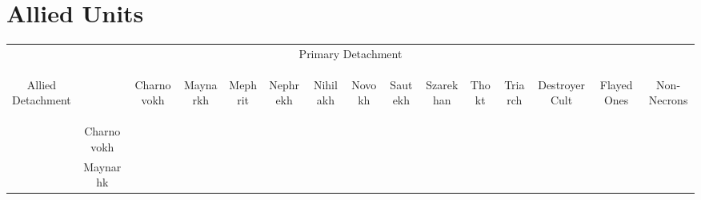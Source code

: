 \section{Allied Units}


\begin{tabular}{||c c c c c c c c c c c c c c c||}
	\hline
	\multicolumn{15}{||c||}{Primary Detachment} \\
	\multirow{14}{*}{\begin{sideways}Allied Detachment\end{sideways}} & & \begin{sideways}Charnovokh \end{sideways} & \begin{sideways}Maynarkh \end{sideways} & \begin{sideways}Mephrit \end{sideways} & \begin{sideways}Nephrekh \end{sideways} & \begin{sideways}Nihilakh \end{sideways} & \begin{sideways}Novokh \end{sideways} & \begin{sideways}Sautekh \end{sideways} & \begin{sideways}Szarekhan \end{sideways} & \begin{sideways}Thokt \end{sideways} & \begin{sideways}Triarch \end{sideways} & \begin{sideways}Destroyer Cult \end{sideways} & \begin{sideways}Flayed Ones \end{sideways} & \begin{sideways}Non-Necrons \end{sideways}\\
	& Charnovokh & & \greyskull & \blackskull & \blackskull & \blackskull & \blackskull & \blackskull & \redskull & \blackskull & \blackskull & \greyskull & \redskull & \redskull \\
	& Maynarhk & \greyskull & & \greyskull & \greyskull & \redskull & \blackskull & \greyskull & \blackskull & \greyskull & \blackskull & \blackskull & \blackskull & \redskull \\

\end{tabular}
